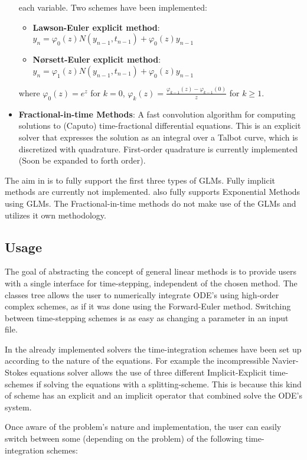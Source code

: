 \begin{itemize}
    each variable. Two schemes have been implemented:
  \begin{itemize}
    \item \textbf{Lawson-Euler explicit method}: $y_n =
      \varphi_0(z)N(y_{n-1},t_{n-1}) + \varphi_0(z)y_{n-1}$
    \item \textbf{N{\o}rsett-Euler explicit method}: $y_n =
      \varphi_1(z)N(y_{n-1},t_{n-1}) + \varphi_0(z)y_{n-1}$
  \end{itemize}
where $\varphi_0(z) = e^{z}$ for $k = 0$, $\varphi_{k}(z) =
\frac{\varphi_{k-1}(z) - \varphi_{k-1}(0)}{z}$ for $k \geq 1$.
  \item \textbf{Fractional-in-time Methods}: A fast convolution
    algorithm for computing solutions to (Caputo) time-fractional
    differential equations. This is an explicit solver that expresses
    the solution as an integral over a Talbot curve, which is
    discretized with quadrature. First-order quadrature is currently
    implemented (Soon be expanded to forth order).

\end{itemize}

The aim in {\nek} is to fully support the first three types of GLMs.
Fully implicit methods are currently not implemented. {\nek} also
fully supports Exponential Methods using GLMs. The Fractional-in-time
methods do not make use of the GLMs and utilizes it own methodology.

\subsection{Usage}
The goal of abstracting the concept of general linear methods is to
provide users with a single interface for time-stepping, independent
of the chosen method. The classes tree allows the user to numerically
integrate ODE's using high-order complex schemes, as if it was done
using the Forward-Euler method.  Switching between time-stepping
schemes is as easy as changing a parameter in an input file.

In the already implemented solvers the time-integration schemes have
been set up according to the nature of the equations.  For example the
incompressible Navier-Stokes equations solver allows the use of three
different Implicit-Explicit time-schemes if solving the equations with
a splitting-scheme.  This is because this kind of scheme has an
explicit and an implicit operator that combined solve the ODE's
system.

Once aware of the problem's nature and implementation, the user can
easily switch between some (depending on the problem) of the following
time-integration schemes:

